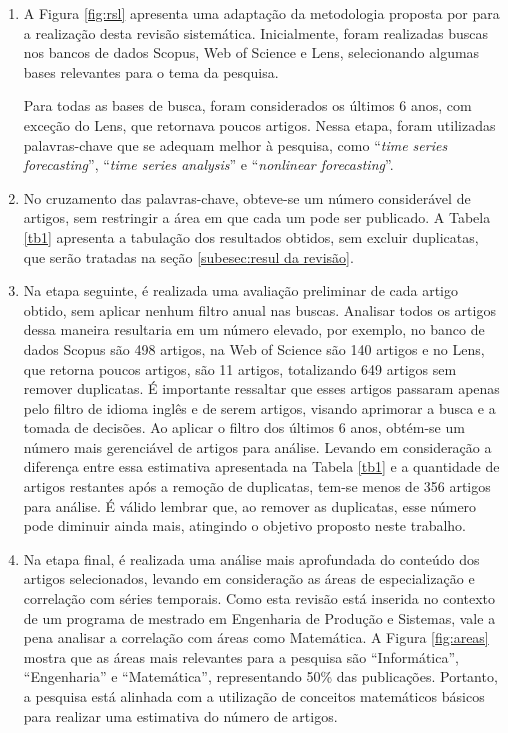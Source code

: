 \begin{enumerate}[start=1, label={\textbf{Etapa} \arabic*}]
	
\item \label{etp:rev-1} A Figura \ref{fig:rsl} apresenta uma adaptação da metodologia proposta por  para a realização desta revisão sistemática. Inicialmente, foram realizadas buscas nos bancos de dados Scopus, Web of Science e Lens, selecionando algumas bases relevantes para o tema da pesquisa.

Para todas as bases de busca, foram considerados os últimos 6 anos, com exceção do Lens, que retornava poucos artigos. Nessa etapa, foram utilizadas palavras-chave que se adequam melhor à pesquisa, como ``\textit{time series forecasting}'', ``\textit{time series analysis}'' e ``\textit{nonlinear forecasting}''.

\item \label{etp:rev-2} No cruzamento das palavras-chave, obteve-se um número considerável de artigos, sem restringir a área em que cada um pode ser publicado. A Tabela \ref{tb1} apresenta a tabulação dos resultados obtidos, sem excluir duplicatas, que serão tratadas na seção \ref{subesec:resul da revisão}.

\item \label{etp:rev-3} Na etapa seguinte, é realizada uma avaliação preliminar de cada artigo obtido, sem aplicar nenhum filtro anual nas buscas. Analisar todos os artigos dessa maneira resultaria em um número elevado, por exemplo, no banco de dados Scopus são 498 artigos, na Web of Science são 140 artigos e no Lens, que retorna poucos artigos, são 11 artigos, totalizando 649 artigos sem remover duplicatas. É importante ressaltar que esses artigos passaram apenas pelo filtro de idioma inglês e de serem artigos, visando aprimorar a busca e a tomada de decisões. Ao aplicar o filtro dos últimos 6 anos, obtém-se um número mais gerenciável de artigos para análise. Levando em consideração a diferença entre essa estimativa apresentada na Tabela \ref{tb1} e a quantidade de artigos restantes após a remoção de duplicatas, tem-se menos de 356 artigos para análise. É válido lembrar que, ao remover as duplicatas, esse número pode diminuir ainda mais, atingindo o objetivo proposto neste trabalho.

\item \label{etp:rev-4} Na etapa final, é realizada uma análise mais aprofundada do conteúdo dos artigos selecionados, levando em consideração as áreas de especialização e correlação com séries temporais. Como esta revisão está inserida no contexto de um programa de mestrado em Engenharia de Produção e Sistemas, vale a pena analisar a correlação com áreas como Matemática. A Figura \ref{fig:areas} mostra que as áreas mais relevantes para a pesquisa são ``Informática'', ``Engenharia'' e ``Matemática'', representando 50\% das publicações. Portanto, a pesquisa está alinhada com a utilização de conceitos matemáticos básicos para realizar uma estimativa do número de artigos.

\end{enumerate}